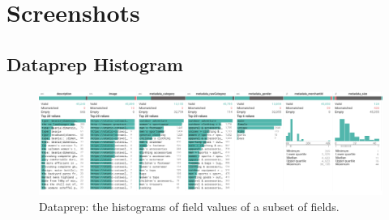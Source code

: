 \chapter{Screenshots}

\section{Dataprep Histogram}
\label{dataprep}

\begin{figure}
  \hspace*{-0.2\textwidth}
  \includegraphics[width=1.4\textwidth]{figures/dataprep}
  \caption{Dataprep: the histograms of field values of a subset of fields.}
\end{figure}
